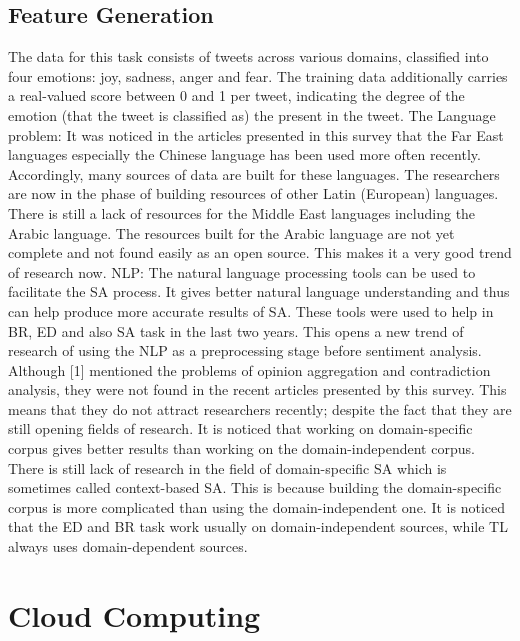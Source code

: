 \documentclass{acmtog} %
\begin{document}
\subsection{Feature Generation}
\label{subsub:feature}

The data for this task consists of tweets across various domains, classified into four emotions: joy, sadness, anger and fear. The training data additionally carries a real-valued score between 0 and 1 per tweet, indicating the degree of the emotion (that the tweet is classified as) the present in the tweet.
The Language problem: It was noticed in the articles presented in this survey that the Far East languages especially the Chinese language has been used more often recently. Accordingly, many sources of data are built for these languages. The researchers are now in the phase of building resources of other Latin (European) languages. There is still a lack of resources for the Middle East languages including the Arabic language. The resources built for the Arabic language are not yet complete and not found easily as an open source. This makes it a very good trend of research now. NLP: The natural language processing tools can be used to facilitate the SA process. It gives better natural language understanding and thus can help produce more accurate results of SA. These tools were used to help in BR, ED and also SA task in the last two years. This opens a new trend of research of using the NLP as a preprocessing stage before sentiment analysis. Although [1] mentioned the problems of opinion aggregation and contradiction analysis, they were not found in the recent articles presented by this survey. This means that they do not attract researchers recently; despite the fact that they are still opening fields of research. It is noticed that working on domain-specific corpus gives better results than working on the domain-independent corpus. There is still lack of research in the field of domain-specific SA which is sometimes called context-based SA. This is because building the domain-specific corpus is more complicated than using the domain-independent one. It is noticed that the ED and BR task work usually on domain-independent sources, while TL always uses domain-dependent sources.


\section{Cloud Computing}
\label{sec:cloud_computing}
\end{document}

